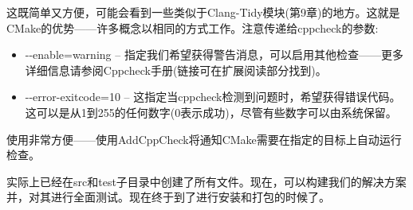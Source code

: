 这既简单又方便，可能会看到一些类似于Clang-Tidy模块(第9章)的地方。这就是CMake的优势——许多概念以相同的方式工作。注意传递给cppcheck的参数:

\begin{itemize}
\item 
-{}-enable=warning – 指定我们希望获得警告消息，可以启用其他检查——更多详细信息请参阅Cppcheck手册(链接可在扩展阅读部分找到)。

\item 
-{}-error-exitcode=10 – 这指定当cppcheck检测到问题时，希望获得错误代码。这可以是从1到255的任何数字(0表示成功)，尽管有些数字可以由系统保留。
\end{itemize}

使用非常方便——使用AddCppCheck将通知CMake需要在指定的目标上自动运行检查。

实际上已经在src和test子目录中创建了所有文件。现在，可以构建我们的解决方案并，对其进行全面测试。现在终于到了进行安装和打包的时候了。


























